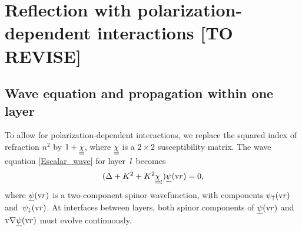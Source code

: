 \section{Reflection with polarization-dependent interactions [TO REVISE]}\label{s:pol}

\MissingSection
{}%



\subsection{Wave equation and propagation within one layer}

To allow for polarization-dependent interactions,
we replace the squared index of refraction $n^2$
by $1+\underline{\underline{\chi}}$, where $\underline{\underline{\chi}}$ is a $2\times 2$ susceptibility matrix.
The wave equation \cref{Escalar_wave} for layer~$l$ becomes
\begin{equation}\label{Ewaveqp}
(\Delta +K^2 +K^2 \underline{\underline{\chi}}_l) \underline{\psi}(\text{v}{r})= 0,
\end{equation}
where $\underline{\psi}(\text{v}{r})$ is a two-component spinor wavefunction,
with components $\psi_\uparrow(\text{v}{r})$ and~$\psi_\downarrow(\text{v}{r})$.
At interfaces between layers,
both spinor components of $\underline{\psi}(\text{v}{r})$ and $\text{v}{\nabla}\underline{\psi}(\text{v}{r})$
must evolve continuously.


